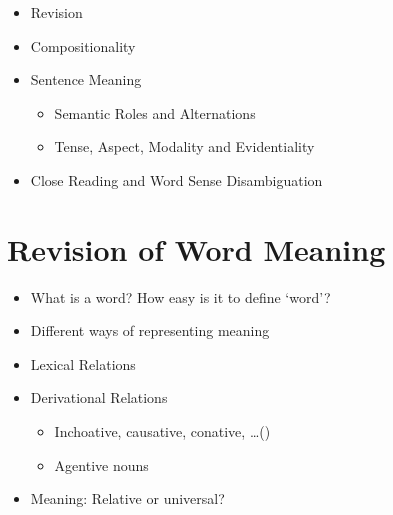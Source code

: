 \documentclass[a4paper,landscape,headrule,footrule,xetex]{foils}
\begin{document}
\maketitle

%



\begin{itemize}
\item Revision
\item Compositionality
\item Sentence Meaning
  \begin{itemize}
  \item Semantic Roles and Alternations
  \item Tense, Aspect, Modality and Evidentiality
  \end{itemize}
\item Close Reading and Word Sense Disambiguation
\end{itemize}

\section{Revision of Word Meaning}

\begin{itemize}
\item What is a word? How easy is it to define ‘word’?
\item Different ways of representing meaning
\item Lexical Relations
\item Derivational Relations
  \begin{itemize}
  \item Inchoative, causative, conative, \ldots ()
  \item Agentive nouns
  \end{itemize}
\item Meaning: Relative or universal?
\end{itemize}
\end{document}

